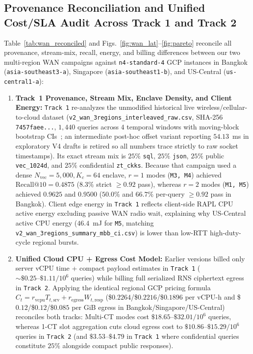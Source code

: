 \documentclass[10pt,journal,compsoc]{IEEEtran}
\begin{document}
\subsection{Provenance Reconciliation and Unified Cost/SLA Audit Across Track 1 and Track 2}
Table~\ref{tab:wan_reconciled} and Figs.~\ref{fig:wan_lat}--\ref{fig:pareto} reconcile all provenance, stream-mix, recall, energy, and billing differences between our two multi-region WAN campaigns against \texttt{n4-standard-4} GCP instances in Bangkok (\nolinkurl{asia-southeast3-a}), Singapore (\nolinkurl{asia-southeast1-b}), and US-Central (\nolinkurl{us-central1-a}):
\begin{enumerate}
    \item \textbf{Track~1 Provenance, Stream Mix, Enclave Density, and Client Energy:} \texttt{Track~1} re-analyzes the unmodified historical live wireless/cellular-to-cloud dataset (\nolinkurl{v2_wan_3regions_interleaved_raw.csv}, SHA-256 \texttt{7457faee...}, $1{,}440$ queries across $4$ temporal windows with moving-block bootstrap CIs~\cite{kunsch1989mbb}; an intermediate post-hoc offset variant reporting $54.13$~ms in exploratory V4 drafts is retired so all numbers trace strictly to raw socket timestamps). Its exact stream mix is $25\%$ \texttt{sql}, $25\%$ \texttt{json}, $25\%$ public \nolinkurl{vec_1024d}, and $25\%$ confidential \nolinkurl{zt_ckks}. Because that campaign used a dense $N_{\text{vec}}=5{,}000, K_c=64$ enclave, $r=1$ modes (\texttt{M3, M4}) achieved $\mathrm{Recall}@10 = 0.4875$ ($8.3\%$ strict $\ge 0.92$ pass), whereas $r=2$ modes (\texttt{M1, M5}) achieved $0.9625$ and $0.9500$ ($50.0\%$ and $66.7\%$ per-query $\ge 0.92$ pass in Bangkok). Client edge energy in \texttt{Track~1} reflects client-side RAPL CPU active energy excluding passive WAN radio wait, explaining why US-Central active CPU energy ($46.4$~mJ for \texttt{M5}, matching \nolinkurl{v2_wan_3regions_summary_mbb_ci.csv}) is lower than low-RTT high-duty-cycle regional bursts.
    \item \textbf{Unified Cloud CPU + Egress Cost Model:} Earlier versions billed only server vCPU time + compact payload estimates in \texttt{Track~1} ($\sim\$0.25\text{--}\$1.11 / 10^6$ queries) while billing full serialized RNS ciphertext egress in \texttt{Track~2}. Applying the identical regional GCP pricing formula $C_t = r_{\text{vcpu}} T_{t,\text{srv}} + r_{\text{egress}} W_{t,\text{resp}}$ (\$$0.2264$/\$$0.2216$/\$$0.1896$ per vCPU-h and \$$0.12$/\$$0.12$/\$$0.085$ per GiB egress in Bangkok/Singapore/US-Central) reconciles both tracks: Multi-CT modes cost $\$18.65\text{--}\$32.01 / 10^6$ queries, whereas 1-CT slot aggregation cuts cloud egress cost to $\$10.86\text{--}\$15.29 / 10^6$ queries in \texttt{Track~2} (and $\$3.53\text{--}\$4.79$ in \texttt{Track~1} where confidential queries constitute $25\%$ alongside compact public responses).

\end{enumerate}
\end{document}

